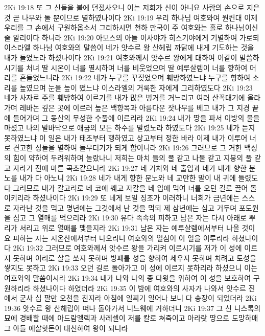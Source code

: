 2Ki 19:18  또 그 신들을 불에 던졌사오니 이는 저희가 신이 아니요 사람의 손으로 지은 것 곧 나무와 돌 뿐이므로 멸하였나이다
2Ki 19:19  우리 하나님 여호와여 원컨대 이제 우리를 그 손에서 구원하옵소서 그리하시면 천하 만국이 주 여호와는 홀로 하나님이신줄 알리이다 하니라
2Ki 19:20  아모스의 아들 이사야가 히스기야에게 기별하여 가로되 이스라엘 하나님 여호와의 말씀이 네가 앗수르 왕 산헤립 까닭에 내게 기도하는 것을 내가 들었노라 하셨나이다
2Ki 19:21  여호와께서 앗수르 왕에게 대하여 이같이 말씀하시기를 처녀 딸 시온이 너를 멸시하며 너를 비웃었으며 딸 예루살렘이 너를 향하여 머리를 흔들었느니라
2Ki 19:22  네가 누구를 꾸짖었으며 훼방하였느냐 누구를 향하여 소리를 높였으며 눈을 높이 떴느냐 이스라엘의 거룩한 자에게 그리하였도다
2Ki 19:23  네가 사자로 주를 훼방하여 이르기를 내가 많은 병거를 거느리고 여러 산꼭대기에 올라가며 레바논 깊은 곳에 이르러 높은 백향목과 아름다운 잣나무를 베고 내가 그 지경 끝에 들어가며 그 동산의 무성한 수풀에 이르리라
2Ki 19:24  내가 땅을 파서 이방의 물을 마셨고 나의 발바닥으로 애굽의 모든 하수를 말렸노라 하였도다
2Ki 19:25  네가 듣지 못하였느냐 이 일은 내가 태초부터 행하였고 상고부터 정한 바라 이제 내가 이루어 너로 견고한 성들을 멸하여 돌무더기가 되게 함이니라
2Ki 19:26  그러므로 그 거한 백성의 힘이 약하여 두려워하며 놀랐나니 저희는 마치 들의 풀 같고 나물 같고 지붕의 풀 같고 자라기 전에 마른 곡초같으니라
2Ki 19:27  네 거처와 네 출입과 네가 내게 향한 분노를 내가 다 아노니
2Ki 19:28  네가 내게 향한 분노와 네 교만한 말이 내 귀에 들렸도다 그러므로 내가 갈고리로 네 코에 꿰고 자갈을 네 입에 먹여 너를 오던 길로 끌어 돌이키리라 하셨나이다
2Ki 19:29  또 네게 보일 징조가 이러하니 너희가 금년에는 스스로 자라난 것을 먹고 명년에는 그것에서 난 것을 먹되 제 삼년에는 심고 거두며 포도원을 심고 그 열매를 먹으리라
2Ki 19:30  유다 족속의 피하고 남은 자는 다시 아래로 뿌리가 서리고 위로 열매를 맺을지라
2Ki 19:31  남은 자는 예루살렘에서부터 나올 것이요 피하는 자는 시온산에서부터 나오리니 여호와의 열심이 이 일을 이루리라 하셨나이다
2Ki 19:32  그러므로 여호와께서 앗수르 왕을 가리켜 이르시기를 저가 이 성에 이르지 못하며 이리로 살을 쏘지 못하며 방패를 성을 향하여 세우지 못하며 치려고 토성을 쌓지도 못하고
2Ki 19:33  오던 길로 돌아가고 이 성에 이르지 못하리라 하셨으니 이는 여호와의 말씀이시라
2Ki 19:34  내가 나와 나의 종 다윗을 위하여 이 성을 보호하여 구원하리라 하셨나이다 하였더라
2Ki 19:35  이 밤에 여호와의 사자가 나와서 앗수르 진에서 군사 십 팔만 오천을 친지라 아침에 일찌기 일어나 보니 다 송장이 되었더라
2Ki 19:36  앗수르 왕 산헤립이 떠나 돌아가서 니느웨에 거하더니
2Ki 19:37  그 신 니스록의 묘에 경배할 때에 아드람멜렉과 사레셀이 저를 칼로 쳐죽이고 아라랏 땅으로 도망하매 그 아들 에살핫돈이 대신하여 왕이 되니라
